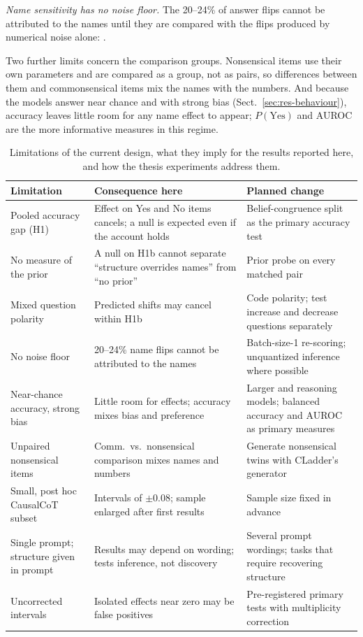 \emph{Name sensitivity has no noise floor.} The 20--24\% of answer flips cannot be attributed to the names until they are compared with the flips produced by numerical noise alone: .

Two further limits concern the comparison groups. Nonsensical items use their own parameters and are compared as a group, not as pairs, so differences between them and commonsensical items mix the names with the numbers. And because the models answer near chance and with strong bias (Sect.~\ref{sec:res-behaviour}), accuracy leaves little room for any name effect to appear; $P(\text{Yes})$ and AUROC are the more informative measures in this regime.

\begin{table}[!htbp]
\centering
\caption{Limitations of the current design, what they imply for the results reported here, and how the thesis experiments address them.}
\label{tab:limits}
\scriptsize
\renewcommand{\arraystretch}{1.15}
\begin{tabular}{p{}p{}p{}}
\toprule
Limitation & Consequence here & Planned change \\
\midrule
Pooled accuracy gap (H1) & Effect on Yes and No items cancels; a null is expected even if the account holds & Belief-congruence split as the primary accuracy test \\
No measure of the prior & A null on H1b cannot separate ``structure overrides names'' from ``no prior'' & Prior probe on every matched pair \\
Mixed question polarity & Predicted shifts may cancel within H1b & Code polarity; test increase and decrease questions separately \\
No noise floor & 20--24\% name flips cannot be attributed to the names & Batch-size-1 re-scoring; unquantized inference where possible \\
Near-chance accuracy, strong bias & Little room for effects; accuracy mixes bias and preference & Larger and reasoning models; balanced accuracy and AUROC as primary measures \\
Unpaired nonsensical items & Comm.\ vs.\ nonsensical comparison mixes names and numbers & Generate nonsensical twins with CLadder's generator \\
Small, post hoc CausalCoT subset & Intervals of $\pm 0.08$; sample enlarged after first results & Sample size fixed in advance \\
Single prompt; structure given in prompt & Results may depend on wording; tests inference, not discovery & Several prompt wordings; tasks that require recovering structure \\
Uncorrected intervals & Isolated effects near zero may be false positives & Pre-registered primary tests with multiplicity correction \\
\bottomrule
\end{tabular}
\end{table}
